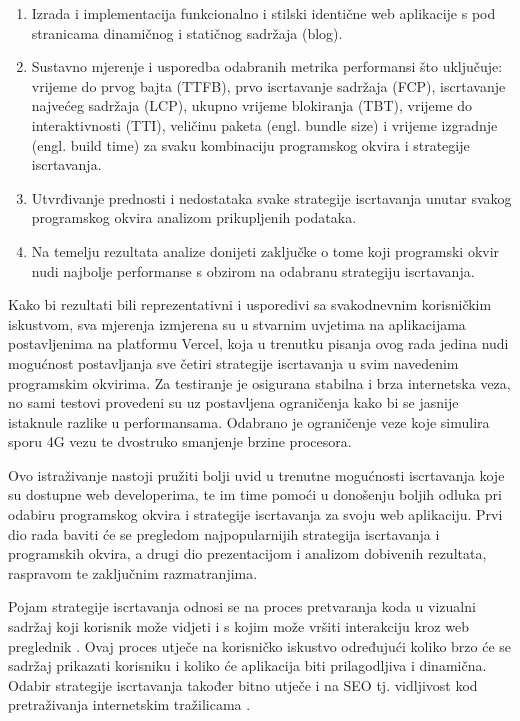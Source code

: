 \begin{enumerate}
    \item Izrada i implementacija funkcionalno i stilski identične web aplikacije s pod stranicama dinamičnog i statičnog sadržaja (blog).
    \item Sustavno mjerenje i usporedba odabranih metrika performansi što uključuje: vrijeme do prvog bajta (TTFB), prvo iscrtavanje sadržaja (FCP), iscrtavanje najvećeg sadržaja (LCP), ukupno vrijeme blokiranja (TBT), vrijeme do interaktivnosti (TTI), veličinu paketa (engl. bundle size) i vrijeme izgradnje (engl. build time) za svaku kombinaciju programskog okvira i strategije iscrtavanja.
    \item Utvrđivanje prednosti i nedostataka svake strategije iscrtavanja unutar svakog programskog okvira analizom prikupljenih podataka.
    \item Na temelju rezultata analize donijeti zaključke o tome koji programski okvir nudi najbolje performanse s obzirom na odabranu strategiju iscrtavanja.
\end{enumerate}

Kako bi rezultati bili reprezentativni i usporedivi sa svakodnevnim korisničkim iskustvom, sva mjerenja izmjerena su u stvarnim uvjetima na aplikacijama postavljenima na platformu Vercel, koja u trenutku pisanja ovog rada jedina nudi mogućnost postavljanja sve četiri strategije iscrtavanja u svim navedenim programskim okvirima. Za testiranje je osigurana stabilna i brza internetska veza, no sami testovi provedeni su uz postavljena ograničenja kako bi se jasnije istaknule razlike u performansama. Odabrano je ograničenje veze koje simulira sporu 4G vezu te dvostruko smanjenje brzine procesora.

\bigskip

Ovo istraživanje nastoji pružiti bolji uvid u trenutne mogućnosti iscrtavanja koje su dostupne web developerima, te im time pomoći u donošenju boljih odluka pri odabiru programskog okvira i strategije iscrtavanja za svoju web aplikaciju. Prvi dio rada baviti će se pregledom najpopularnijih strategija iscrtavanja i programskih okvira, a drugi dio prezentacijom i analizom dobivenih rezultata, raspravom te zaključnim razmatranjima.


Pojam strategije iscrtavanja odnosi se na proces pretvaranja koda u vizualni sadržaj koji korisnik može vidjeti i s kojim može vršiti interakciju kroz web preglednik \cite{moore2024rendering}. Ovaj proces utječe na korisničko iskustvo određujući koliko brzo će se sadržaj prikazati korisniku i koliko će aplikacija biti prilagodljiva i dinamična.
Odabir strategije iscrtavanja također bitno utječe i na SEO tj. vidljivost kod pretraživanja internetskim tražilicama \cite{bratslavsky2025rendering}.

